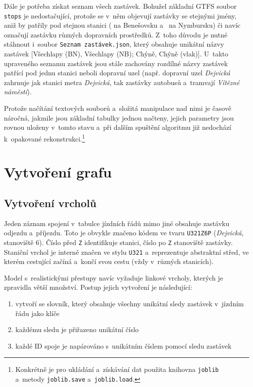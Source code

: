 Dále je potřeba získat seznam všech zastávek. Bohužel základní GTFS soubor \texttt{stops} je nedostačující, protože se v~něm objevují zastávky se stejnými jmény, aniž by patřily pod stejnou stanici ( na Benešovsku a~ na Nymbursku) či navíc označují zastávku různých dopravních prostředků. Z~toho důvodu je nutné stáhnout i~soubor \texttt{Seznam zastávek.json}, který obsahuje unikátní názvy zastávek [Všechlapy (BN), Všechlapy (NB); Chýně, Chýně (vlak)]. U~takto upraveného seznamu zastávek jsou stále zachovány rozdílné názvy zastávek patřící pod jednu stanici neboli dopravní uzel (např. dopravní uzel \textit{Dejvická} zahrnuje jak stanici metra \textit{Dejvická}, tak zastávky autobusů a~tramvají \textit{Vítězné náměstí}). 

Protože načítání textových souborů a~složitá manipulace nad nimi je časově náročná, jakmile jsou základní tabulky jednou načteny, jejich parametry jsou rovnou uloženy v~tomto stavu a~při dalším spuštění algoritmu již nedochází k~opakované rekonstrukci.\footnote{Konkrétně je pro ukládání a~získávání dat použita knihovna \texttt{joblib} a~metody \texttt{joblib.save} a~\texttt{joblib.load}.}

\section{Vytvoření grafu}
\subsection{Vytvoření vrcholů}
Jeden záznam spojení v~tabulce jízdních řádů mimo jiné obsahuje zastávku odjezdu a~příjezdu. Toto je obvykle značeno kódem ve tvaru \texttt{U321Z6P} (\textit{Dejvická}, stanoviště 6). Číslo před \texttt{Z} identifikuje stanici, číslo po \texttt{Z} stanoviště zastávky. Staniční vrchol je interně značen ve stylu \texttt{U321} a~reprezentuje abstraktní střed, ve kterém cestující začíná a~končí svou cestu (vždy v~různých stanicích).

Model s~realistickými přestupy navíc vyžaduje linkové vrcholy, kterých je zpravidla větší množství. Postup jejich vytvoření je následující: \begin{enumerate}[label = \normalfont\itembox{\roman{enumi})}]
	\item vytvoří se slovník, který obsahuje všechny unikátní sledy zastávek v~jízdním řádu jako klíče
	\item každému sledu je přiřazeno unikátní číslo
	\item každé ID spoje je napárováno s~unikátním číslem pomocí sledu zastávek
\end{enumerate}

